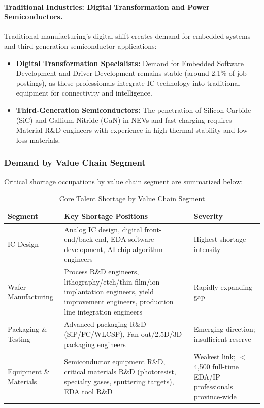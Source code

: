 \documentclass[12pt,a4paper]{article}
\newcommand{\tableHeaderRow}{\rowcolor{tealPrimary}\color{white}}
\newcommand{\tableOddRow}{\rowcolor{mintBG}}
\newcommand{\tableEvenRow}{\rowcolor{white}}
\begin{document}
\paragraph{Traditional Industries: Digital Transformation and Power Semiconductors.}
Traditional manufacturing's digital shift creates demand for embedded systems
and third-generation semiconductor applications:

\begin{itemize}
    \item \textbf{Digital Transformation Specialists:} Demand for Embedded
          Software Development and Driver Development remains stable (around
          2.1\% of job postings), as these professionals integrate IC
          technology into traditional equipment for connectivity and
          intelligence.
    \item \textbf{Third-Generation Semiconductors:} The penetration of Silicon
          Carbide (SiC) and Gallium Nitride (GaN) in NEVs and fast charging
          requires Material R\&D engineers with experience in high thermal
          stability and low-loss materials.
\end{itemize}

\subsubsection{Demand by Value Chain Segment}

Critical shortage occupations by value chain segment are summarized below:

\begin{table}[H]
\centering
\caption{Core Talent Shortage by Value Chain Segment}
\label{tab:talent_shortage}
\begin{tabular}{p{2.5cm}p{7cm}p{3.5cm}}
\toprule
\tableHeaderRow
\textbf{Segment} & \textbf{Key Shortage Positions} & \textbf{Severity} \\
\midrule
\tableOddRow  IC Design & Analog IC design, digital front-end/back-end, EDA software development, AI chip algorithm engineers & Highest shortage intensity \\
\tableEvenRow Wafer Manufacturing & Process R\&D engineers, lithography/etch/thin-film/ion implantation engineers, yield improvement engineers, production line integration engineers & Rapidly expanding gap \\
\tableOddRow  Packaging \& Testing & Advanced packaging R\&D (SiP/FC/WLCSP), Fan-out/2.5D/3D packaging engineers & Emerging direction; insufficient reserve \\
\tableEvenRow Equipment \& Materials & Semiconductor equipment R\&D, critical materials R\&D (photoresist, specialty gases, sputtering targets), EDA tool R\&D & Weakest link; $<$4,500 full-time EDA/IP professionals province-wide \\
\bottomrule
\end{tabular}
\end{table}
\end{document}
